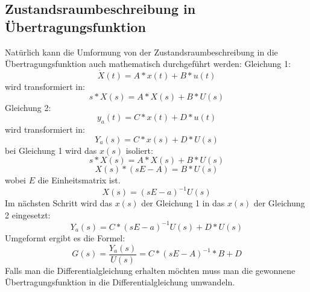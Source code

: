 \subsection*{Zustandsraumbeschreibung in Übertragungsfunktion}
Natürlich kann die Umformung von der Zustandsraumbeschreibung in die Übertragungsfunktion auch mathematisch durchgeführt werden:
Gleichung 1:
\begin{equation}
	\dot{X}(t)=A*x(t)+B*u(t)
\end{equation}
wird transformiert in:
\begin{equation}
	s*X(s)=A*X(s)+B*U(s)
\end{equation}
Gleichung 2:
\begin{equation}
	y_{a}(t)=C*x(t)+D*u(t)
\end{equation}
wird transformiert in:
\begin{equation}
	Y_{a}(s)=C*x(s)+D*U(s)
\end{equation}
bei Gleichung 1 wird  das $x(s)$ isoliert:
\begin{equation}
	s*X(s)=A*X(s)+B*U(s)
\end{equation}
\begin{equation}
	X(s)*(sE-A)=B*U(s)
\end{equation}
wobei $E$ die Einheitsmatrix ist.
\begin{equation}
	X(s)=(sE-a)^{-1}U(s)
\end{equation}
Im nächsten Schritt wird das $x(s)$ der Gleichung 1 in das $x(s)$ der Gleichung 2 eingesetzt:
\begin{equation}
	Y_{a}(s)=C*(sE-a)^{-1}U(s)+D*U(s)
\end{equation}
Umgeformt ergibt es die Formel:
\begin{equation}
	G(s)=\frac{Y_{a}(s)}{U(s)}=C*(sE-A)^{-1}*B+D
\end{equation}
Falls man die Differentialgleichung erhalten möchten muss man die gewonnene Übertragungsfunktion in die Differentialgleichung umwandeln.

